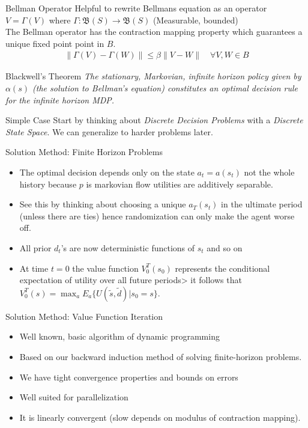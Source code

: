 \documentclass[xcolor=pdftex,dvipsnames,table,mathserif,aspectratio=169]{beamer}
\begin{document}
\begin{frame}{Bellman Operator}
Helpful to rewrite Bellmans equation as an operator $V = \Gamma(V)$ where $\Gamma: \mathfrak{B}(S) \rightarrow \mathfrak{B}(S)$ (Measurable, bounded) \\
\vspace{0.5cm}
The Bellman operator has the contraction mapping property which guarantees a unique fixed point point in $B$.
\begin{eqnarray*}
\| \Gamma(V) - \Gamma(W) \| \leq \beta \| V-W \| \quad \forall V,W \in B
\end{eqnarray*}
\begin{block}{Blackwell's Theorem}
\textit{The stationary, Markovian, infinite horizon policy given by $\alpha(s)$ (the solution to Bellman's equation)  constitutes an optimal decision rule for the infinite horizon MDP.}
\end{block}
\end{frame}

\begin{frame}{Simple Case}
Start by thinking about \textit{Discrete Decision Problems} with a \textit{Discrete State Space}.  We can generalize to harder problems later.
\end{frame}

\begin{frame}{Solution Method: Finite Horizon Problems}
\begin{itemize}
\item The optimal decision depends only on the state $a_t = a(s_t)$ not the whole history because $p$ is markovian flow utilities are additively separable.
\item See this by thinking about choosing a unique $a_T(s_t)$ in the ultimate period (unless there are ties) hence randomization can only make the agent worse off.
\item All prior $d_t$'s are now deterministic functions of $s_t$ and so on
\item At time $t=0$ the value function $V_0^T(s_0)$ represents the conditional expectation of utility over all future periods> it follows that $V_0^T(s) = \max_{a} E_{a}\{ U(\tilde{s},\tilde{d}) | s_0 = s\}$.
\end{itemize}
\end{frame}

\begin{frame}{Solution Method: Value Function Iteration}
\begin{itemize}
\item Well known, basic algorithm of dynamic programming
\item Based on our backward induction method of solving finite-horizon problems.
\item We have tight convergence properties and bounds on errors
\item Well suited for parallelization
\item It is linearly convergent (slow depends on modulus of contraction mapping).
\end{itemize}
\end{frame}
\end{document}
